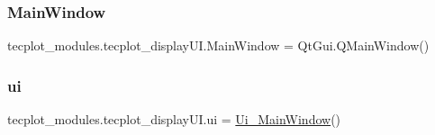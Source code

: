 \subsubsection{\texorpdfstring{Main\+Window}{MainWindow}}
{\footnotesize\ttfamily tecplot\+\_\+modules.\+tecplot\+\_\+display\+U\+I.\+Main\+Window = Qt\+Gui.\+Q\+Main\+Window()}

\hypertarget{a00064_aa95df04768ef9b320020d0084673133a}{}\label{a00064_aa95df04768ef9b320020d0084673133a} 
\subsubsection{\texorpdfstring{ui}{ui}}
{\footnotesize\ttfamily tecplot\+\_\+modules.\+tecplot\+\_\+display\+U\+I.\+ui = \hyperlink{a00114}{Ui\+\_\+\+Main\+Window}()}

